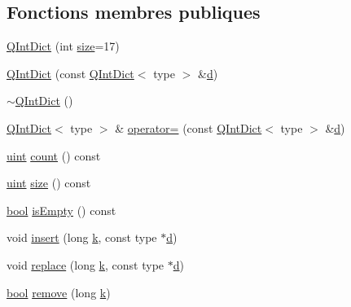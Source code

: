\subsection*{Fonctions membres publiques}
\begin{DoxyCompactItemize}
\item 
\hyperlink{class_q_int_dict_a8e08f6bd27944aba2448a7d46599344e}{Q\+Int\+Dict} (int \hyperlink{class_q_int_dict_ac9068db1c75884d25db84970ff428d1c}{size}=17)
\item 
\hyperlink{class_q_int_dict_af742692f072b38878864d47294cc82f0}{Q\+Int\+Dict} (const \hyperlink{class_q_int_dict}{Q\+Int\+Dict}$<$ type $>$ \&\hyperlink{060__command__switch_8tcl_af43f4b1f0064a33b2d662af9f06d3a00}{d})
\item 
\hyperlink{class_q_int_dict_ab1ff6588ba4de70cbc48f7cd71c9868d}{$\sim$\+Q\+Int\+Dict} ()
\item 
\hyperlink{class_q_int_dict}{Q\+Int\+Dict}$<$ type $>$ \& \hyperlink{class_q_int_dict_a4244a6c344ab404ca576d343ae6613fb}{operator=} (const \hyperlink{class_q_int_dict}{Q\+Int\+Dict}$<$ type $>$ \&\hyperlink{060__command__switch_8tcl_af43f4b1f0064a33b2d662af9f06d3a00}{d})
\item 
\hyperlink{qglobal_8h_a4d3943ddea65db7163a58e6c7e8df95a}{uint} \hyperlink{class_q_int_dict_a7ce9a98ad6ddf53a9d34c93ffb4b1242}{count} () const 
\item 
\hyperlink{qglobal_8h_a4d3943ddea65db7163a58e6c7e8df95a}{uint} \hyperlink{class_q_int_dict_ac9068db1c75884d25db84970ff428d1c}{size} () const 
\item 
\hyperlink{qglobal_8h_a1062901a7428fdd9c7f180f5e01ea056}{bool} \hyperlink{class_q_int_dict_ae6d375d5bf5a7d4d6fd4010aba6988f3}{is\+Empty} () const 
\item 
void \hyperlink{class_q_int_dict_a35741cb744a4a35802f63157a8ca35d8}{insert} (long \hyperlink{060__command__switch_8tcl_a20363f854eb4098a446733d63d34dbc1}{k}, const type $\ast$\hyperlink{060__command__switch_8tcl_af43f4b1f0064a33b2d662af9f06d3a00}{d})
\item 
void \hyperlink{class_q_int_dict_a799b08f520ac7f188d8d602cc9ecdeb8}{replace} (long \hyperlink{060__command__switch_8tcl_a20363f854eb4098a446733d63d34dbc1}{k}, const type $\ast$\hyperlink{060__command__switch_8tcl_af43f4b1f0064a33b2d662af9f06d3a00}{d})
\item 
\hyperlink{qglobal_8h_a1062901a7428fdd9c7f180f5e01ea056}{bool} \hyperlink{class_q_int_dict_aac763816e720327cb6f5a66817bf2484}{remove} (long \hyperlink{060__command__switch_8tcl_a20363f854eb4098a446733d63d34dbc1}{k})

\end{DoxyCompactItemize}
